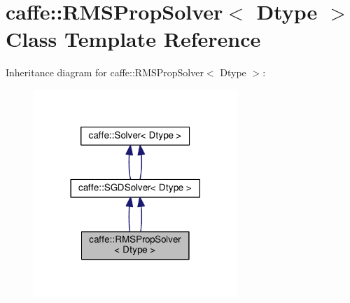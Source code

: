 \hypertarget{classcaffe_1_1_r_m_s_prop_solver}{}\section{caffe\+:\+:R\+M\+S\+Prop\+Solver$<$ Dtype $>$ Class Template Reference}
\label{classcaffe_1_1_r_m_s_prop_solver}


Inheritance diagram for caffe\+:\+:R\+M\+S\+Prop\+Solver$<$ Dtype $>$\+:
\nopagebreak
\begin{figure}[H]
\begin{center}
\leavevmode
\includegraphics[width=218pt]{classcaffe_1_1_r_m_s_prop_solver__inherit__graph}
\end{center}
\end{figure}
